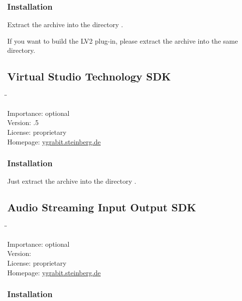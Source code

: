 \subsubsection{Installation}

Extract the archive into the directory .

If you want to build the LV2 plug-in, please extract the archive
 into the same directory.

\subsection{Virtual Studio Technology SDK}

\begin{tabbing}
  \hspace*{6em}\=\=\kill

  Importance:  \> optional \\
  Version:     .5 \\
  License:     \> proprietary \\
  Homepage:    \> \href{http://ygrabit.steinberg.de/}{ygrabit.steinberg.de}
\end{tabbing}

\subsubsection{Installation}

Just extract the archive into the directory
.

\subsection{Audio Streaming Input Output SDK}

\begin{tabbing}
  \hspace*{6em}\=\=\kill

  Importance:  \> optional \\
  Version:      \\
  License:     \> proprietary \\
  Homepage:    \> \href{http://ygrabit.steinberg.de/}{ygrabit.steinberg.de}
\end{tabbing}

\subsubsection{Installation}

